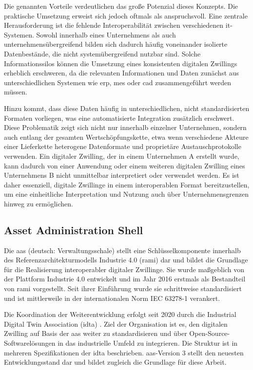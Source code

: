 Die genannten Vorteile verdeutlichen das große Potenzial dieses Konzepts. 
Die praktische Umsetzung erweist sich jedoch oftmals als anspruchsvoll.
Eine zentrale Herausforderung ist die fehlende Interoperabilität zwischen verschiedenen \ac{it}-Systemen.
Sowohl innerhalb eines Unternehmens als auch unternehmensübergreifend bilden sich dadurch häufig voneinander isolierte Datenbestände, die nicht systemübergreifend nutzbar sind.
Solche Informationssilos können die Umsetzung eines konsistenten digitalen Zwillings erheblich erschweren, da die relevanten Informationen und Daten zunächst aus unterschiedlichen Systemen wie \ac{erp}, \ac{mes} oder \ac{cad} zusammengeführt werden müssen.

Hinzu kommt, dass diese Daten häufig in unterschiedlichen, nicht standardisierten Formaten vorliegen, was eine automatisierte Integration zusätzlich erschwert.
Diese Problematik zeigt sich nicht nur innerhalb einzelner Unternehmen, sondern auch entlang der gesamten Wertschöpfungskette, etwa wenn verschiedene Akteure einer Lieferkette heterogene Datenformate und proprietäre Austauschprotokolle verwenden.
Ein digitaler Zwilling, der in einem Unternehmen A erstellt wurde, kann dadurch von einer Anwendung oder einem weiteren digitalen Zwilling eines Unternehmens B nicht unmittelbar interpretiert oder verwendet werden.
Es ist daher essenziell, digitale Zwillinge in einem interope\-rablen Format bereitzustellen, um eine einheitliche Interpretation und Nutzung auch über Unternehmensgrenzen hinweg zu ermöglichen.
\cite{DTandAASConceptsInI4.0}

\newpage
\subsection{Asset Administration Shell}
\label{chap:AAS}

Die \acs{aas} (deutsch: Verwaltungsschale) stellt eine Schlüsselkomponente innerhalb des Referenzarchitekturmodells Industrie 4.0 (\acs{rami}) \cite{RAMI4.0} dar und bildet die Grundlage für die Realisierung interoperabler digitaler Zwillinge. 
Sie wurde maßgeblich von der Plattform Industrie 4.0 entwickelt und im Jahr 2016 erstmals als Bestandteil von \acs{rami} vorgestellt. 
Seit ihrer Einführung wurde sie schrittweise standardisiert und ist mittlerweile in der internationalen Norm IEC 63278-1 \cite{AASIEC63278} verankert.

Die Koordination der Weiterentwicklung erfolgt seit 2020 durch die Industrial Digital Twin Association (\acs{idta}) \cite{IDTA}. 
Ziel der Organisation ist es, den digitalen Zwilling auf Basis der \acs{aas} weiter zu standardisieren und über Open-Source-Softwarelösungen in das industrielle Umfeld zu integrieren. 
Die Struktur ist in mehreren Spezifikationen der \acs{idta} beschrieben.
\acs{aas}-Version 3 stellt den neuesten Entwicklungsstand dar und bildet zugleich die Grundlage für diese Arbeit.


